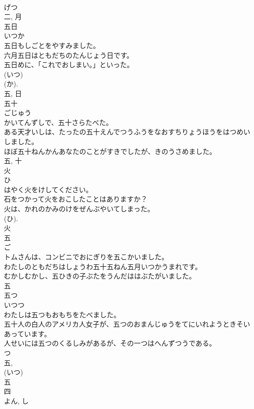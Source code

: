\documentclass[8pt]{extreport}
\begin{document}
\begin{CJK}{UTF8}{min}
\\	げつ 
\\	二, 月	
\\	五日	
\\	いつか	
\\	五日もしごとをやすみました。	
\\	六月五日はともだちのたんじょう日です。	
\\	五日めに、「これでおしまい。」といった。	
\\	(いつ) 
\\	(か). 
\\	五, 日	
\\	五十	
\\	ごじゅう	
\\	かいてんずしで、五十さらたべた。	
\\	ある天才いしは、たったの五十えんでつうふうをなおすちりょうほうをはつめいしました。	
\\	ほぼ五十ねんかんあなたのことがすきでしたが、きのうさめました。	
\\	五, 十	
\\	火	
\\	ひ	
\\	はやく火をけしてください。	
\\	石をつかって火をおこしたことはありますか？	
\\	火は、かれのかみのけをぜんぶやいてしまった。	
\\	(ひ). 
\\	火	
\\	五	
\\	ご	
\\	トムさんは、コンビニでおにぎりを五こかいました。	
\\	わたしのともだちはしょうわ五十五ねん五月いつかうまれです。	
\\	むかしむかし、五ひきの子ぶたをうんだははぶたがいました。	
\\	五	
\\	五つ	
\\	いつつ	
\\	わたしは五つもおもちをたべました。	
\\	五十人の白人のアメリカ人女子が、五つのおまんじゅうをてにいれようときそいあっています。	
\\	人せいには五つのくるしみがあるが、その一つはへんずつうである。	
\\	つ 
\\	五, 
\\	(いつ) 
\\	五	
\\	四	
\\	よん, し	

\end{CJK}
\end{document}
